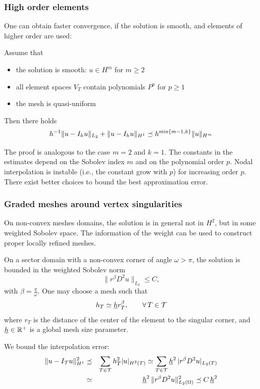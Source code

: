 \subsubsection{High order elements}

One can obtain faster convergence, if the solution is smooth, and elements of higher
order are used:
\begin{theorem} Assume that
\begin{itemize}
\item the solution is smooth: $u \in H^m$ for $m \geq 2$ 
\item all element spaces $V_T$ contain polynomials $P^p$ for $p \geq 1$
\item the mesh is quasi-uniform
\end{itemize}
Then there holds
$$
h^{-1} \| u - I_h u \|_{L_2} + \| u  - I_h u \|_{H^1} \preceq h^{\min\{ m-1,k\} } \| u \|_{H^m}
$$
\end{theorem}

The proof is analogous to the case $m=2$ and $k=1$. The constants in
the estimates depend on the Sobolev index $m$ and on the polynomial
order $p$. Nodal interpolation is instable (i.e., the constant grow
with $p$) for increasing order $p$. There exist better choices to
bound the best approximation error.



\subsubsection{Graded meshes around vertex singularities}

On non-convex meshes domains, the solution is in general not in $H^2$, but
in some weighted Sobolev space. The information of the weight can be used to
construct proper locally refined meshes.

On a sector domain with a non-convex corner of angle $\omega > \pi$, the
solution is bounded in the weighted Sobolev norm
$$
\| r^\beta D^2 u \|_{L_2} \leq C,
$$
with $\beta = \frac{\pi}{\omega}$. One may choose a mesh such that
$$
h_T \simeq \underline h r_T^\beta, \qquad \forall \, T \in {\cal T}
$$
where $r_T$ is the distance of the center of the element to the singular
corner, and $\underline h \in {\mathbb R}^+$ is a global mesh size parameter.


We bound the interpolation error:
\begin{eqnarray*}
\| u - I_{\cal T} u \|_{H^1}^2 & \preceq &
\sum_{T \in \cal T} h_T^2 | u |_{H^2(T)} \simeq
\sum_{T \in \cal T} \underline h^2 \, | r^\beta D^2 u |_{L_2(T)} \\
& \simeq & \underline h^2 \, \| r^\beta D^2 u \|_{L_2(\Omega)}^2
\preceq C \, \underline h^2
\end{eqnarray*}


